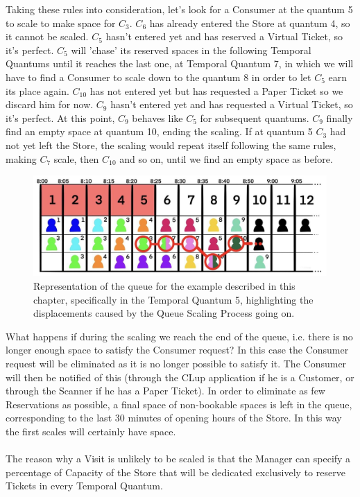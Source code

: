 \documentclass[a4paper, 12pt, oneside, table]{article}
\begin{document}
    Taking these rules into consideration, let's look for a Consumer at the quantum 5 to scale to make space for $ C_3 $. $ C_6 $ has already entered the Store at quantum 4, so it cannot be scaled. $ C_5 $ hasn't entered yet and has reserved a Virtual Ticket, so it's perfect. $ C_5 $ will 'chase' its reserved spaces in the following Temporal Quantums until it reaches the last one, at Temporal Quantum 7, in which we will have to find a Consumer to scale down to the quantum 8 in order to let $ C_5 $ earn its place again. $ C_10 $ has not entered yet but has requested a Paper Ticket so we discard him for now. $ C_9 $ hasn't entered yet and has requested a Virtual Ticket, so it's perfect. At this point, $ C_9 $ behaves like $ C_5 $ for subsequent quantums. $ C_9 $ finally find an empty space at quantum 10, ending the scaling. If at quantum 5 $ C_3 $ had not yet left the Store, the scaling would repeat itself following the same rules, making $ C_7 $ scale, then $ C_10 $ and so on, until we find an empty space as before.
\begin{figure}[hbt]
\centering
	\centering
  	\includegraphics[height=0.15\textheight, scale=0.2, keepaspectratio]{img/queue/queue_ex3.jpg} 
	\caption{Representation of the queue for the example described in this chapter, specifically in the Temporal Quantum 5, highlighting the displacements caused by the Queue Scaling Process going on.}
 	\label{queueex3}
\end{figure}

What happens if during the scaling we reach the end of the queue, i.e. there is no longer enough space to satisfy the Consumer request? In this case the Consumer request will be eliminated as it is no longer possible to satisfy it. The Consumer will then be notified of this (through the CLup application if he is a Customer, or through the Scanner if he has a Paper Ticket). In order to eliminate as few Reservations as possible, a final space of non-bookable spaces is left in the queue, corresponding to the last 30 minutes of opening hours of the Store. In this way the first scales will certainly have space.\\
\\
The reason why a Visit is unlikely to be scaled is that the Manager can specify a percentage of Capacity of the Store that will be dedicated exclusively to reserve Tickets in every Temporal Quantum.
\end{document}
